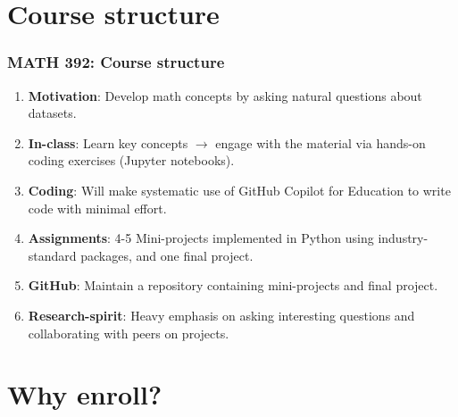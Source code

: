 \documentclass{beamer}
\theoremstyle{definition}
\begin{document}
\section{Course structure}

\frame
{\frametitle{MATH 392: Course structure}
\begin{enumerate}[$\bullet$]
    \item \textbf{Motivation}: Develop math concepts by asking natural questions about datasets. \vspace{0.03in} \pause
    \item \textbf{In-class}: Learn key concepts $\longrightarrow$ engage with the material via hands-on coding exercises (Jupyter notebooks). \vspace{0.03in} \pause
    \item \textbf{Coding}: Will make systematic use of GitHub Copilot for Education to write code with minimal effort. \vspace{0.03in} \pause
    \item \textbf{Assignments}: 4-5 Mini-projects implemented in Python using industry-standard packages, and one final project. \vspace{0.03in} \pause
    \item \textbf{GitHub}: Maintain a repository containing mini-projects and final project. \vspace{0.03in} \pause
    \item \textbf{Research-spirit}: Heavy emphasis on asking interesting questions and collaborating with peers on projects.
\end{enumerate}
}

\section{Why enroll?}
\end{document}
